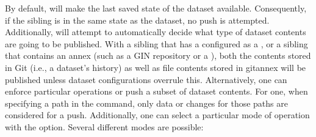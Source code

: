 \sphinxAtStartPar
By default,  will make the last saved state of the dataset
available. Consequently, if the sibling is in the same state as the dataset,
no push is attempted.
Additionally,  will attempt to automatically decide what type
of dataset contents are going to be published. With a sibling that has a
{\hyperref[\detokenize{glossary:term-special-remote}]{}} configured as a {\hyperref[\detokenize{glossary:term-publication-dependency}]{}},
or a sibling that contains an annex (such as a GIN repository or a
{\hyperref[\detokenize{glossary:term-Remote-Indexed-Archive-RIA-store}]{}}), both the contents
stored in Git (i.e., a dataset’s history) as well as file contents stored in
git\sphinxhyphen{}annex will be published unless dataset configurations overrule this.
Alternatively, one can enforce particular operations or push a subset of dataset
contents. For one, when specifying a path in the  command,
only data or changes for those paths are considered for a push.
Additionally, one can select a particular mode of operation with the  option.
Several different modes are possible:
